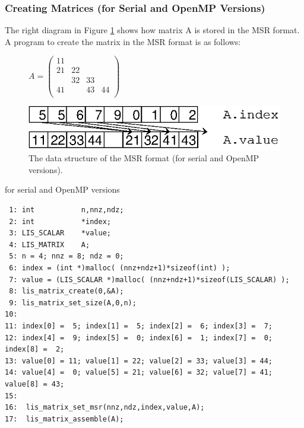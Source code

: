 \documentclass[a4paper]{article}
\begin{document}
\subsubsection{Creating Matrices (for Serial and OpenMP Versions)}
The right diagram in Figure \ref{fig:storage03} shows how matrix A is stored in the MSR format. A program to create the matrix in the MSR format is as follows:
\begin{figure}[h]
{\centering 
\begin{minipage}{0.3\textwidth}
\begin{flushright}
$ 
A = \left(
\begin{array}{cccc}
11 &    &    &    \\
21 & 22 &    &    \\
   & 32 & 33 &    \\
41 &    & 43 & 44 \\
\end{array}\right)
$
\end{flushright}
\end{minipage}
\begin{minipage}{0.6\textwidth}
\begin{flushleft}
\includegraphics{storage03.eps} 
\end{flushleft}
\end{minipage}
\caption{The data structure of the MSR format (for serial and OpenMP versions).}\label{fig:storage03}}
\end{figure}
\begin{itembox}[l]{for serial and OpenMP versions}
\small
\begin{verbatim}
 1: int           n,nnz,ndz;
 2: int           *index;
 3: LIS_SCALAR    *value;
 4: LIS_MATRIX    A;
 5: n = 4; nnz = 8; ndz = 0;
 6: index = (int *)malloc( (nnz+ndz+1)*sizeof(int) );
 7: value = (LIS_SCALAR *)malloc( (nnz+ndz+1)*sizeof(LIS_SCALAR) );
 8: lis_matrix_create(0,&A);
 9: lis_matrix_set_size(A,0,n);
10:
11: index[0] =  5; index[1] =  5; index[2] =  6; index[3] =  7;
12: index[4] =  9; index[5] =  0; index[6] =  1; index[7] =  0; index[8] =  2;
13: value[0] = 11; value[1] = 22; value[2] = 33; value[3] = 44;
14: value[4] =  0; value[5] = 21; value[6] = 32; value[7] = 41; value[8] = 43;
15:
16:  lis_matrix_set_msr(nnz,ndz,index,value,A);
17:  lis_matrix_assemble(A);
\end{verbatim}
\end{itembox}
\newpage
\end{document}

